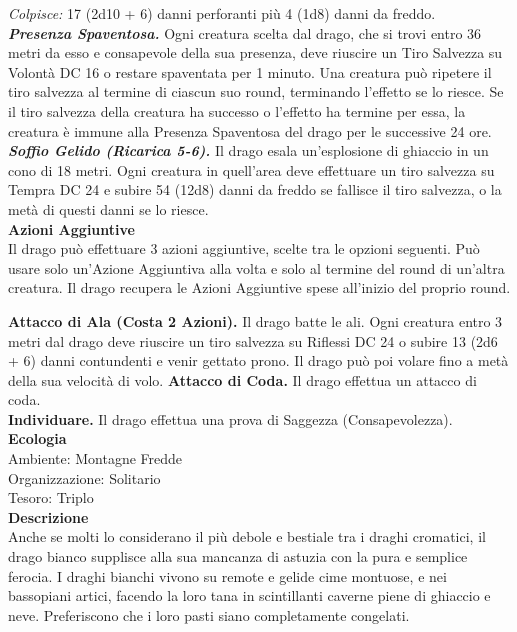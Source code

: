 \begin{multicols}{2}
\emph{Colpisce:} 17 (2d10 + 6) danni perforanti più 4 (1d8) danni da freddo.\\
\emph{\textbf{Presenza Spaventosa.}} Ogni creatura scelta dal drago, che si trovi entro 36 metri da esso e consapevole della sua presenza, deve riuscire un Tiro Salvezza su Volontà DC  16 o restare spaventata per 1 minuto. Una creatura può ripetere il tiro salvezza al termine di ciascun suo round, terminando l'effetto se lo riesce. Se il tiro salvezza della creatura ha successo o l'effetto ha termine per essa, la creatura è immune alla Presenza Spaventosa del drago per le successive 24 ore.\\
\emph{\textbf{Soffio Gelido (Ricarica 5-6).}} Il drago esala un'esplosione di ghiaccio in un cono di 18 metri. Ogni creatura in quell'area deve effettuare un tiro salvezza su Tempra DC  24 e subire 54 (12d8) danni da freddo se fallisce il tiro salvezza, o la metà di questi danni se lo riesce.\\
\textbf{Azioni Aggiuntive} \\
Il drago può effettuare 3 azioni aggiuntive, scelte tra le opzioni seguenti. Può usare solo un'Azione Aggiuntiva alla volta e solo al termine del round di un'altra creatura. Il drago recupera le Azioni Aggiuntive spese all'inizio del proprio round.

\textbf{Attacco di Ala (Costa 2 Azioni).} Il drago batte le ali. Ogni creatura entro 3 metri dal drago deve riuscire un tiro salvezza su Riflessi DC  24 o subire 13 (2d6 + 6) danni contundenti e venir gettato prono. Il drago può poi volare fino a metà della sua velocità di volo. \textbf{Attacco di Coda.} Il drago effettua un attacco di coda. \\
\textbf{Individuare.} Il drago effettua una prova di Saggezza (Consapevolezza).
\textbf{Ecologia}\\
Ambiente: Montagne Fredde\\
Organizzazione: Solitario\\
Tesoro: Triplo\\
\textbf{Descrizione}\\
Anche se molti lo considerano il più debole e bestiale tra i draghi cromatici, il drago bianco supplisce alla sua mancanza di astuzia con la pura e semplice ferocia. I draghi bianchi vivono su remote e gelide cime montuose, e nei bassopiani artici, facendo la loro tana in scintillanti caverne piene di ghiaccio e neve. Preferiscono che i loro pasti siano completamente congelati.\\



\end{multicols}

